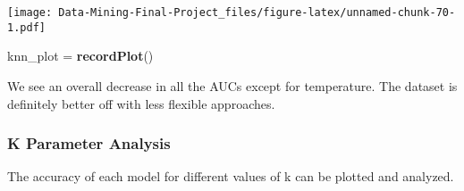 \documentclass[
]{article}
\newenvironment{Shaded}{\begin{snugshade}}{\end{snugshade}}
\newcommand{\FunctionTok}[1]{\textcolor[rgb]{0.13,0.29,0.53}{\textbf{#1}}}
\newcommand{\NormalTok}[1]{#1}
\newcommand{\OtherTok}[1]{\textcolor[rgb]{0.56,0.35,0.01}{#1}}
\begin{document}
\texttt{[image: Data-Mining-Final-Project\_files/figure-latex/unnamed-chunk-70-1.pdf]}

\begin{Shaded}
\begin{Highlighting}[]
\NormalTok{knn\_plot }\OtherTok{=} \FunctionTok{recordPlot}\NormalTok{()}
\end{Highlighting}
\end{Shaded}

We see an overall decrease in all the AUCs except for temperature. The
dataset is definitely better off with less flexible approaches.

\subsubsection{K Parameter Analysis}\label{k-parameter-analysis}

The accuracy of each model for different values of k can be plotted and
analyzed.
\end{document}
